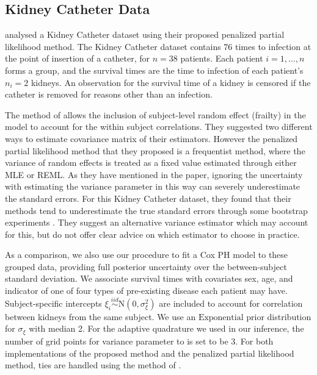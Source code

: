 \documentclass[ba]{imsart}
\begin{document}
\subsection{Kidney Catheter Data}\label{subsec:kidney}

\cite{freqPL} analysed a Kidney Catheter dataset using their proposed penalized partial likelihood method. The Kidney Catheter dataset contains 76 times to infection at the point of insertion of a catheter, for $n = 38$ patients. Each patient $i=1,\ldots,n$ forms a group, and the survival times are the time to infection of each patient's $n_{i} = 2$ kidneys. An observation for the survival time of a kidney is censored if the catheter is removed for reasons other than an infection. 

The method of \cite{freqPL} allows the inclusion of subject-level random effect (frailty) in the model to account for the within subject correlations. They suggested two different ways to estimate covariance matrix of their estimators. However the penalized partial likelihood method that they proposed is a frequentist method, where the variance of random effects is treated as a fixed value estimated through either MLE or REML. As they have mentioned in the paper, ignoring the uncertainty with estimating the variance parameter in this way can severely underestimate the standard errors. For this Kidney Catheter dataset, they found that their methods tend to underestimate the true standard errors through some bootstrap experiments \citep{freqPL}. They suggest an alternative variance estimator which may account for this, but do not offer clear advice on which estimator to choose in practice.

As a comparison, we also use our procedure to fit a Cox PH model to these grouped data, providing full posterior uncertainty over the between-subject standard deviation. We associate survival times with covariates sex, age, and indicator of one of four types of pre-existing disease each patient may have. Subject-specific intercepts $\xi_{i}\overset{iid}{\sim}\text{N}(0,\sigma^{2}_{\xi})$ are included to account for correlation between kidneys from the same subject. We use an $\text{Exponential}$ prior distribution for $\sigma_{\xi}$ with median 2. For the adaptive quadrature we used in our inference, the number of grid points for variance parameter to is set to be 3. For both implementations of the proposed method and the penalized partial likelihood method, ties are handled using the method of \cite{Breslow}.
\end{document}
